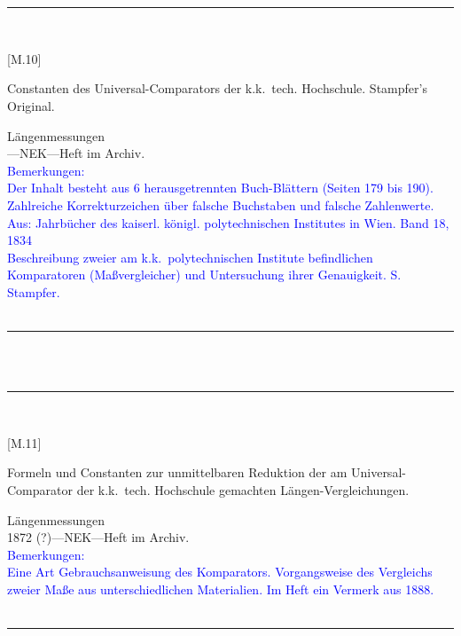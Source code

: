 \\
\vspace*{-2.5pt}\\
\parbox{\textwidth}{%
\rule{\textwidth}{1pt}\vspace*{-3mm}\\
\begin{minipage}[t]{0.22\textwidth}\vspace{0pt}
\Huge\rule[-4mm]{0cm}{1cm}[M.10]
\end{minipage}
\hfill
\begin{minipage}[t]{0.78\textwidth}\vspace{0pt}
\large Constanten des Universal-Comparators der k.k.\ tech. Hochschule. Stampfer's Original.\rule[-2mm]{0mm}{2mm}
\end{minipage}
{\footnotesize\flushright
Längenmessungen\\
}
\quad---\quad NEK\quad---\quad Heft im Archiv.\\
\textcolor{blue}{Bemerkungen:\\{}
Der Inhalt besteht aus 6 herausgetrennten Buch-Blättern (Seiten 179 bis 190). Zahlreiche Korrekturzeichen über falsche Buchstaben und falsche Zahlenwerte.\\{}
Aus: {\glqq}Jahrbücher des kaiserl. königl. polytechnischen Institutes in Wien. Band 18, 1834{\grqq}\\{}
Beschreibung zweier am k.k.\ polytechnischen Institute befindlichen Komparatoren (Maßvergleicher) und Untersuchung ihrer Genauigkeit. S. Stampfer.\\{}
}
\\[-15pt]
\rule{\textwidth}{1pt}
}
\\
\vspace*{-2.5pt}\\
\parbox{\textwidth}{%
\rule{\textwidth}{1pt}\vspace*{-3mm}\\
\begin{minipage}[t]{0.22\textwidth}\vspace{0pt}
\Huge\rule[-4mm]{0cm}{1cm}[M.11]
\end{minipage}
\hfill
\begin{minipage}[t]{0.78\textwidth}\vspace{0pt}
\large Formeln und Constanten zur unmittelbaren Reduktion der am Universal-Comparator der k.k.\ tech. Hochschule gemachten Längen-Vergleichungen.\rule[-2mm]{0mm}{2mm}
\end{minipage}
{\footnotesize\flushright
Längenmessungen\\
}
1872 (?)\quad---\quad NEK\quad---\quad Heft im Archiv.\\
\textcolor{blue}{Bemerkungen:\\{}
Eine Art Gebrauchsanweisung des Komparators. Vorgangsweise des Vergleichs zweier Maße aus unterschiedlichen Materialien. Im Heft ein Vermerk aus 1888.\\{}
}
\\[-15pt]
\rule{\textwidth}{1pt}
}
